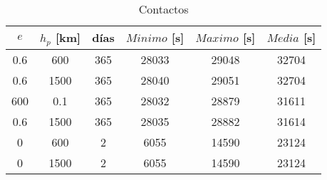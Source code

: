 \begin{table}[H] 
\centering 
\captionsetup{justification=centering,margin=10mm} 
\caption{Contactos} 
	{\renewcommand{\arraystretch}{1.2} 
	\begin{tabular}{cccccc} 
		$e$ & $h_p$ [km] & días & $Minimo$ [s] & $Maximo$ [s] & $Media$ [s] \\ 
		\hline 
		0.6 & 600 & 365 & 28033 & 29048 & 32704 \\ 
		0.6 & 1500 & 365 & 28040 & 29051 & 32704 \\ 
		600 & 0.1 & 365 & 28032 & 28879 & 31611 \\ 
		0.6 & 1500 & 365 & 28035 & 28882 & 31614 \\ 
		0 & 600 & 2 & 6055 & 14590 & 23124 \\ 
		0 & 1500 & 2 & 6055 & 14590 & 23124 \\ 
		\hline 
	\end{tabular} 
	} 
\label{tab:contactos} 
\end{table}